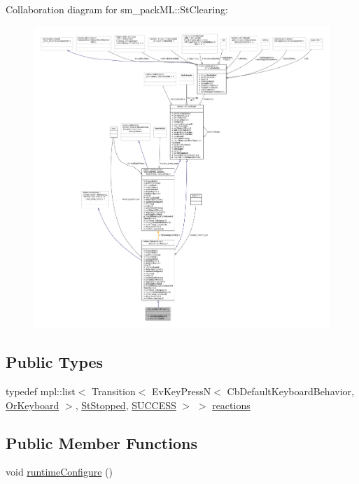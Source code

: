 Collaboration diagram for sm\+\_\+pack\+ML\+:\+:St\+Clearing\+:
\nopagebreak
\begin{figure}[H]
\begin{center}
\leavevmode
\includegraphics[width=350pt]{structsm__packML_1_1StClearing__coll__graph}
\end{center}
\end{figure}
\subsection*{Public Types}
\begin{DoxyCompactItemize}
\item 
typedef mpl\+::list$<$ Transition$<$ Ev\+Key\+PressN$<$ Cb\+Default\+Keyboard\+Behavior, \hyperlink{classsm__packML_1_1OrKeyboard}{Or\+Keyboard} $>$, \hyperlink{structsm__packML_1_1StStopped}{St\+Stopped}, \hyperlink{classSUCCESS}{S\+U\+C\+C\+E\+SS} $>$ $>$ \hyperlink{structsm__packML_1_1StClearing_a94075db172b4e30d02ec9d5d93216ab3}{reactions}
\end{DoxyCompactItemize}
\subsection*{Public Member Functions}
\begin{DoxyCompactItemize}
\item 
void \hyperlink{structsm__packML_1_1StClearing_a5482b52bf9c97a5ef422403c27f92f49}{runtime\+Configure} ()
\end{DoxyCompactItemize}
